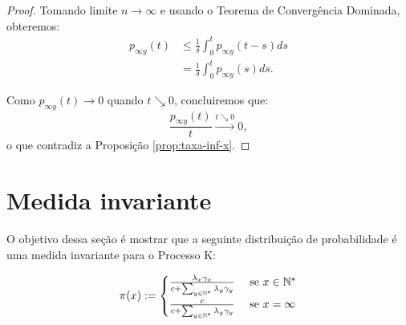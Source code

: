 \begin{proof}
  Tomando limite $n \to \infty$ e usando o Teorema de Convergência
  Dominada, obteremos:
  \begin{align*}
     p_{\infty y}(t)
     &\leq \frac{1}{\delta} \int_0^t p_{\infty y}(t - s) d s\\
     &  =  \frac{1}{\delta} \int_0^t p_{\infty y}(s) d s .
  \end{align*}

  Como  $p_{\infty y}(t) \to 0$ quando $t \searrow 0$, concluiremos que:
  \begin{displaymath}
    \frac{p_{\infty y}(t)}{t} \xrightarrow{t \searrow 0} 0,
  \end{displaymath}
  o que contradiz a Proposição \ref{prop:taxa-inf-x}.
\end{proof}


\section{Medida invariante}
\label{sec:invariante}

O objetivo dessa seção é mostrar que a seguinte distribuição de
probabilidade é uma medida invariante para o Processo K:

\begin{equation}
  \label{eq:invariante}
  \pi(x) := \begin{cases}
    \frac{\lambda_x \gamma_x}{c + \sum_{y \in {\mathbb{N^*}}} \lambda_y \gamma_y}
    & \textrm{ se } x \in {\mathbb{N^*}} \\
    \frac{c}{c + \sum_{y \in {\mathbb{N^*}}} \lambda_y \gamma_y}
    & \textrm{ se } x = \infty \\
  \end{cases}
\end{equation}


